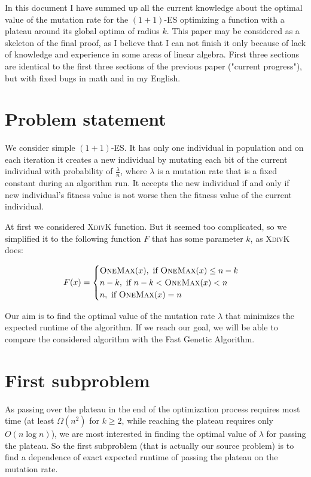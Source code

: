 \documentclass{article}
\newcommand{\OM}{\textsc{OneMax}\xspace}
\newcommand{\XdK}{\textsc{XdivK}\xspace}
\begin{document}
In this document I have summed up all the current knowledge about the optimal value of the mutation rate for the $(1 + 1)$-ES optimizing a function with a plateau around its global optima of radius $k$. This paper may be considered as a skeleton of the final proof, as I believe that I can not finish it only because of lack of knowledge and experience in some areas of linear algebra. First three sections are identical to the first three sections of the previous paper ("current progress"), but with fixed bugs in math and in my English.

\section{Problem statement}

We consider simple $(1 + 1)$-ES. It has only one individual in population and on each iteration it creates a new individual by mutating each bit of the current individual with probability of $\frac{\lambda}{n}$, where $\lambda$ is a mutation rate that is a fixed constant during an algorithm run. It accepts the new individual if and only if new individual's fitness value is not worse then the fitness value of the current individual.

At first we considered \XdK function. But it seemed too complicated, so we simplified it to the following function $F$ that has some parameter $k$, as \XdK does:

\begin{align*}
  F(x) =
  \begin{cases}
    \OM(x), \text{ if } \OM(x) \le n - k \\
    n - k, \text{ if } n - k < \OM(x) < n \\
    n, \text{ if } \OM(x) = n \\
  \end{cases}
\end{align*}

Our aim is to find the optimal value of the mutation rate $\lambda$ that minimizes the expected runtime of the algorithm. If we reach our goal, we will be able to compare the considered algorithm with the Fast Genetic Algorithm.

\section{First subproblem}
As passing over the plateau in the end of the optimization process requires most time (at least $\Omega(n^2)$ for $k \ge 2$, while reaching the plateau requires only $O(n \log n)$), we are most interested in finding the optimal value of $\lambda$ for passing the plateau. So the first subproblem (that is actually our source problem) is to find a dependence of exact expected runtime of passing the plateau on the mutation rate.
\end{document}
